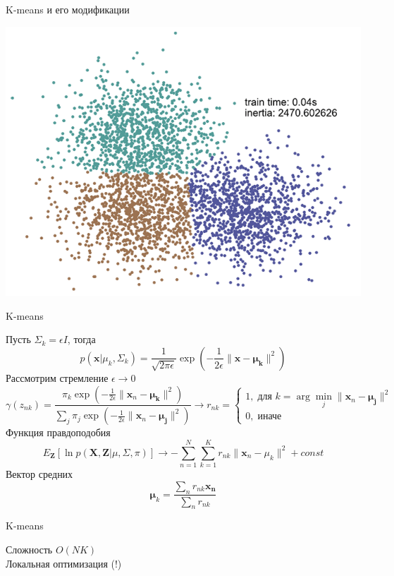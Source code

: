 \documentclass[aspectratio=169]{beamer}
\begin{document}
\begin{frame}{}

\begin{center}
{\LARGE K-means и его модификации}

\vspace{2em}
\includegraphics[scale=0.3]{images/k-cover.png}
\end{center}

\end{frame}

\begin{frame}{K-means}

Пусть $\Sigma_k = \epsilon I$, тогда
\[
p(\mathbf{x} | \mu_k, \Sigma_k) = \frac{1}{\sqrt{2\pi\epsilon}}\exp(-\frac{1}{2\epsilon}\|\mathbf{x}-\mathbf{\mu_k}\|^2)
\]
Рассмотрим стремление $\epsilon \rightarrow 0$
\[
\gamma(z_{nk}) = \frac{\pi_k \exp(-\frac{1}{2\epsilon}\|\mathbf{x}_n-\mathbf{\mu_k}\|^2)}{\sum_j \pi_j \exp(-\frac{1}{2\epsilon}\|\mathbf{x}_n-\mathbf{\mu_j}\|^2)} \rightarrow r_{nk} = \begin{cases}
1, \; \text{для } k = \arg \min_j \|\mathbf{x}_n - \mathbf{\mu_j}\|^2 \\
0, \; \text{иначе}
\end{cases}
\]
Функция правдоподобия
\[
E_\mathbf{Z}[\ln p(\mathbf{X}, \mathbf{Z} | \mu, \Sigma, \pi)] \rightarrow -\sum_{n=1}^N \sum_{k=1}^K r_{nk} \| \mathbf{x}_n - \mu_k \|^2 + const
\]
Вектор средних
\[
\mathbf{\mu}_k = \frac{\sum_n r_{nk} \mathbf{x_n}}{\sum_n r_{nk}} 
\]

\end{frame}

\begin{frame}{K-means}

\kmeans
Сложность $O(NK)$ \\
Локальная оптимизация (!)

\end{frame}
\end{document}
